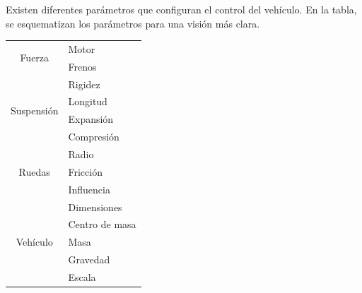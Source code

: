 \documentclass[11pt,a4paper,hidelinks]{article}
\begin{document}
Existen diferentes parámetros que configuran el control del vehículo.
En la tabla, se esquematizan los parámetros para una visión más clara.
\begin{center}
\begin{tabular}{ | c | l | }
	\hline
	\multirow{2}{*}{Fuerza}
	& Motor \\
	& Frenos \\
	\hline
	\multirow{4}{*}{Suspensión}
	& Rigidez \\
	& Longitud \\
	& Expansión \\
	& Compresión \\
	\hline
	\multirow{3}{*}{Ruedas}
	& Radio \\
	& Fricción \\
	& Influencia \\
	\hline
	\multirow{5}{*}{Vehículo}
	& Dimensiones \\
	& Centro de masa \\
	& Masa \\
	& Gravedad \\
	& Escala \\
	\hline
\end{tabular}
\end{center}
\end{document}
